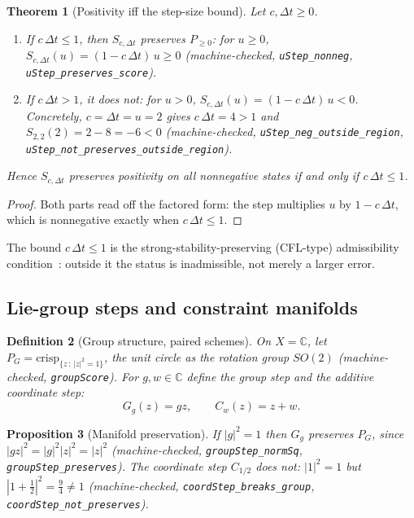 \documentclass[11pt,a4paper]{article}
\newtheorem{theorem}{Theorem}[section]
\newtheorem{proposition}[theorem]{Proposition}
\newtheorem{definition}[theorem]{Definition}
\begin{document}
\begin{theorem}[Positivity iff the step-size bound]
\label{thm:ssp}
Let $c, \Delta t \ge 0$.
\begin{enumerate}[label=\textup{(\alph*)},nosep]
\item If $c\,\Delta t \le 1$, then $S_{c,\Delta t}$ preserves
  $P_{\ge 0}$: for $u \ge 0$,
  $S_{c,\Delta t}(u) = (1 - c\,\Delta t)\,u \ge 0$
  (machine-checked, \texttt{uStep\_nonneg},
  \texttt{uStep\_preserves\_score}).
\item If $c\,\Delta t > 1$, it does not: for $u > 0$,
  $S_{c,\Delta t}(u) = (1 - c\,\Delta t)\,u < 0$.
  Concretely, $c = \Delta t = u = 2$ gives $c\,\Delta t = 4 > 1$ and
  $S_{2,2}(2) = 2 - 8 = -6 < 0$
  (machine-checked, \texttt{uStep\_neg\_outside\_region},
  \texttt{uStep\_not\_preserves\_outside\_region}).
\end{enumerate}
Hence $S_{c,\Delta t}$ preserves positivity on all nonnegative states
if and only if $c\,\Delta t \le 1$.
\end{theorem}
\begin{proof}
Both parts read off the factored form: the step multiplies $u$ by
$1 - c\,\Delta t$, which is nonnegative exactly when
$c\,\Delta t \le 1$.
\end{proof}

The bound $c\,\Delta t \le 1$ is the strong-stability-preserving
(CFL-type) admissibility condition~\cite{gottlieb2001}: outside it the
status is inadmissible, not merely a larger error.

\subsection{Lie-group steps and constraint manifolds}

\begin{definition}[Group structure, paired schemes]
\label{def:liegroup}
On $X = \mathbb{C}$, let
$P_{G} = \mathrm{crisp}_{\{z \,:\, |z|^2 = 1\}}$, the unit circle as
the rotation group $SO(2)$
(machine-checked, \texttt{groupScore}).
For $g, w \in \mathbb{C}$ define the group step and the additive
coordinate step:
\[
  G_g(z) = g z, \qquad C_w(z) = z + w .
\]
\end{definition}

\begin{proposition}[Manifold preservation]
\label{thm:liegroup}
If $|g|^2 = 1$ then $G_g$ preserves $P_G$, since
$|g z|^2 = |g|^2 |z|^2 = |z|^2$
(machine-checked, \texttt{groupStep\_normSq},
\texttt{groupStep\_preserves}).
The coordinate step $C_{1/2}$ does not: $|1|^2 = 1$ but
$|1 + \tfrac{1}{2}|^2 = \tfrac{9}{4} \neq 1$
(machine-checked, \texttt{coordStep\_breaks\_group},
\texttt{coordStep\_not\_preserves}).
\end{proposition}
\end{document}

